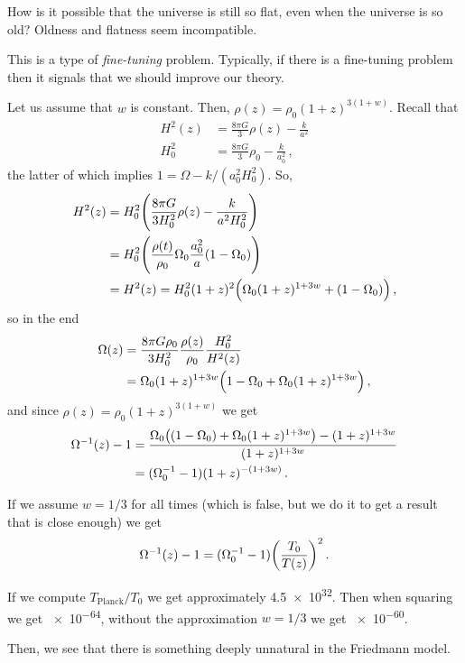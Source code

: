 \documentclass[main.tex]{subfiles}
\begin{document}
How is it possible that the universe is still so flat, even when the universe is so old? Oldness and flatness seem incompatible.

This is a type of \emph{fine-tuning} problem. Typically, if there is a fine-tuning problem then it signals that we should improve our theory.

Let us assume that \(w\) is constant. Then, \(\rho (z) = \rho_{0} (1+z)^{3(1+w)}\). Recall that 
%
\begin{subequations}
\begin{align}
  H^2(z) &= \frac{8 \pi G }{3} \rho (z) - \frac{k}{a^2}  \\
  H_0^2 &= \frac{8 \pi G}{3}\rho_0 - \frac{k}{a_0^2}
\,,
\end{align}
\end{subequations}
%
the latter of which implies \(1 = \Omega - k / (a_0^2 H_0^2)\). So, 
%
\begin{subequations}
\begin{align}
  H^2(z) &= H_0^2 \qty(\frac{8 \pi G }{3 H_0^2} \rho (z) - \frac{k}{a^2 H_0^2}) \\
  &= H_0^2 \qty(\frac{\rho (t)}{\rho_0 }\Omega_0 \frac{a_0^2}{a} (1-\Omega_0 ))  \\
  &= H^2(z) = H_0^2 (1+z)^2 \qty(\Omega_0 (1+z)^{1+3w} + (1-\Omega_0 ))
\,,
\end{align}
\end{subequations}
%
so in the end 
%
\begin{subequations}
\begin{align}
  \Omega (z) &= \frac{8 \pi G \rho_0 }{3 H_0^2 } \frac{\rho (z)}{\rho_0 } \frac{H_0^2}{H^2(z)} \\
  &=\Omega_0 (1+z)^{1+3w} \qty(1-\Omega_0 + \Omega_0 (1+z)^{1+3w}) 
\,,
\end{align}
\end{subequations}
%
and since \(\rho (z) = \rho_0 (1+z)^{3(1+w)}\) we get 
%
\begin{subequations}
\begin{align}
  \Omega^{-1} (z) -1 &= \frac{\Omega_0 \qty((1-\Omega_0 ) + \Omega_0 (1+z)^{1+3w}) - (1+z)^{1+3w} }{(1+z)^{1+3w}}  \\
  &= (\Omega_0^{-1} -1) (1+z)^{-(1+3w)}
\,.
\end{align}
\end{subequations}

If we assume \(w = 1/3\) for all times (which is false, but we do it to get a result that is close enough) we get 
%
\begin{align}
  \Omega ^{-1} (z) -1= (\Omega_0 ^{-1} -1) \qty(\frac{T_0 }{T(z)})^{2}
\,.
\end{align}

If we compute \(T _{\text{Planck}} / T_0 \) we get approximately \num{4.5e32}. Then when squaring we get \num{e-64}, without the approximation \(w=1/3\) we get \num{e-60}.

Then, we see that there is something deeply unnatural in the Friedmann model.
\end{document}
